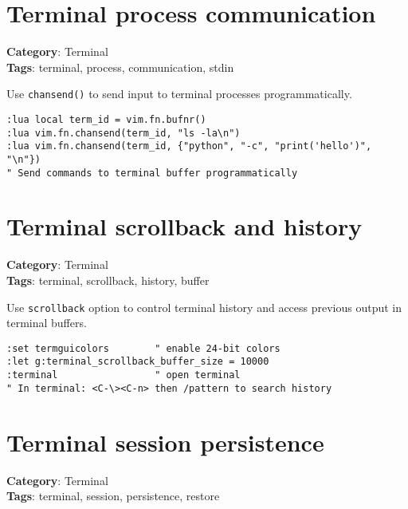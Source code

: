 {{{{{{{{{{\section{Terminal process communication}

\textbf{Category}: Terminal\\ \textbf{Tags}: terminal, process, communication, stdin
\vspace{0.5cm}

Use {\footnotesize \Verb§chansend()§} to send input to terminal processes programmatically.

\begin{Exa*}{}
\begin{Verbatim}[fontsize=\footnotesize, breaklines, breakanywhere]
:lua local term_id = vim.fn.bufnr()
:lua vim.fn.chansend(term_id, "ls -la\n")
:lua vim.fn.chansend(term_id, {"python", "-c", "print('hello')", "\n"})
" Send commands to terminal buffer programmatically
\end{Verbatim}
\end{Exa*}

\section{Terminal scrollback and history}

\textbf{Category}: Terminal\\ \textbf{Tags}: terminal, scrollback, history, buffer
\vspace{0.5cm}

Use {\footnotesize \Verb§scrollback§} option to control terminal history and access previous output in terminal buffers.

\begin{Exa*}{}
\begin{Verbatim}[fontsize=\footnotesize, breaklines, breakanywhere]
:set termguicolors        " enable 24-bit colors
:let g:terminal_scrollback_buffer_size = 10000
:terminal                 " open terminal
" In terminal: <C-\><C-n> then /pattern to search history
\end{Verbatim}
\end{Exa*}

\section{Terminal session persistence}

\textbf{Category}: Terminal\\ \textbf{Tags}: terminal, session, persistence, restore
\vspace{0.5cm}

}}}}}}}}}}
